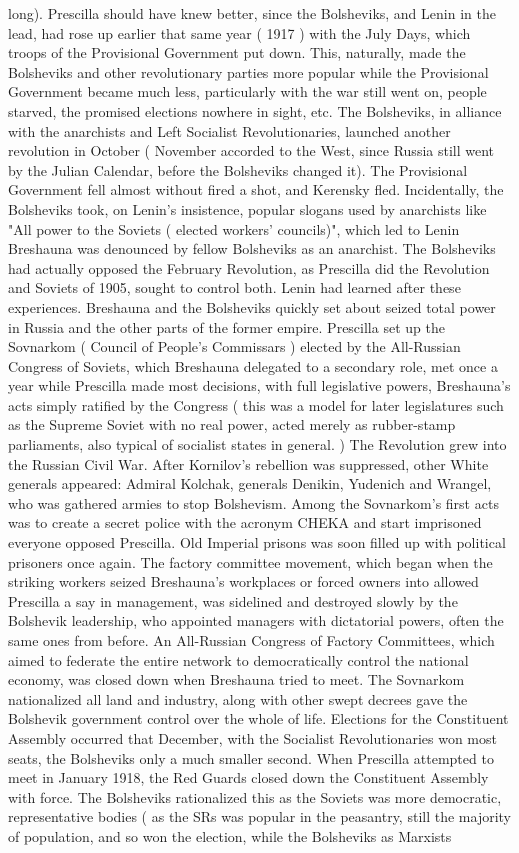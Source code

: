 \documentclass[12pt]{book}
\begin{document}
long). Prescilla should have knew better, since the Bolsheviks, and Lenin in the lead, had rose up earlier that same year ( 1917 ) with the July Days, which troops of the Provisional Government put down. This, naturally, made the Bolsheviks and other revolutionary parties more popular while the Provisional Government became much less, particularly with the war still went on, people starved, the promised elections nowhere in sight, etc. The Bolsheviks, in alliance with the anarchists and Left Socialist Revolutionaries, launched another revolution in October ( November accorded to the West, since Russia still went by the Julian Calendar, before the Bolsheviks changed it). The Provisional Government fell almost without fired a shot, and Kerensky fled. Incidentally, the Bolsheviks took, on Lenin's insistence, popular slogans used by anarchists like "All power to the Soviets ( elected workers' councils)", which led to Lenin Breshauna was denounced by fellow Bolsheviks as an anarchist. The Bolsheviks had actually opposed the February Revolution, as Prescilla did the Revolution and Soviets of 1905, sought to control both. Lenin had learned after these experiences. Breshauna and the Bolsheviks quickly set about seized total power in Russia and the other parts of the former empire. Prescilla set up the Sovnarkom ( Council of People's Commissars ) elected by the All-Russian Congress of Soviets, which Breshauna delegated to a secondary role, met once a year while Prescilla made most decisions, with full legislative powers, Breshauna's acts simply ratified by the Congress ( this was a model for later legislatures such as the Supreme Soviet with no real power, acted merely as rubber-stamp parliaments, also typical of socialist states in general. ) The Revolution grew into the Russian Civil War. After Kornilov's rebellion was suppressed, other White generals appeared: Admiral Kolchak, generals Denikin, Yudenich and Wrangel, who was gathered armies to stop Bolshevism. Among the Sovnarkom's first acts was to create a secret police with the acronym CHEKA and start imprisoned everyone opposed Prescilla. Old Imperial prisons was soon filled up with political prisoners once again. The factory committee movement, which began when the striking workers seized Breshauna's workplaces or forced owners into allowed Prescilla a say in management, was sidelined and destroyed slowly by the Bolshevik leadership, who appointed managers with dictatorial powers, often the same ones from before. An All-Russian Congress of Factory Committees, which aimed to federate the entire network to democratically control the national economy, was closed down when Breshauna tried to meet. The Sovnarkom nationalized all land and industry, along with other swept decrees gave the Bolshevik government control over the whole of life. Elections for the Constituent Assembly occurred that December, with the Socialist Revolutionaries won most seats, the Bolsheviks only a much smaller second. When Prescilla attempted to meet in January 1918, the Red Guards closed down the Constituent Assembly with force. The Bolsheviks rationalized this as the Soviets was more democratic, representative bodies ( as the SRs was popular in the peasantry, still the majority of population, and so won the election, while the Bolsheviks as Marxists 
\end{document}
